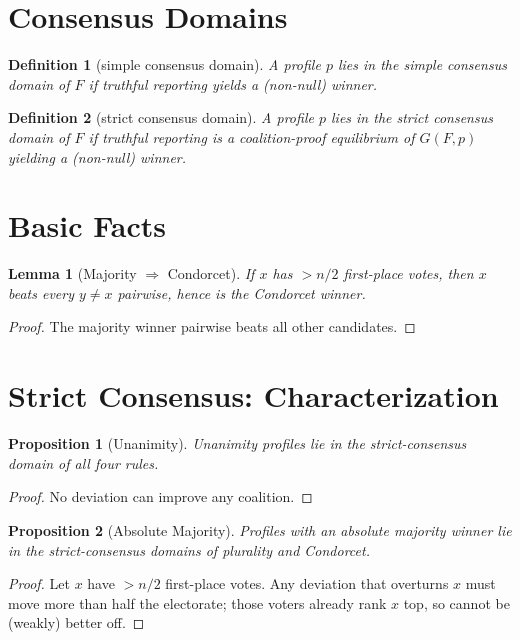\documentclass{article}
\newtheorem{lemma}{Lemma}
\newtheorem{proposition}{Proposition}
\newtheorem{definition}{Definition}
\begin{document}
\section{Consensus Domains}
\begin{definition}[simple consensus domain]
A profile $p$ lies in the simple consensus domain of $F$ if truthful reporting yields a (non-null) winner.
\end{definition}

\begin{definition}[strict consensus domain]
A profile $p$ lies in the strict consensus domain of $F$ if truthful reporting is a coalition-proof equilibrium of $G(F,p)$ yielding a (non-null) winner.
\end{definition}

\section{Basic Facts}
\begin{lemma}[Majority $\Rightarrow$ Condorcet]
If $x$ has $> n/2$ first-place votes, then $x$ beats every $y\neq x$ pairwise, hence is the Condorcet winner.
\end{lemma}
\begin{proof}
The majority winner pairwise beats all other candidates.
\end{proof}

\section{Strict Consensus: Characterization}
\begin{proposition}[Unanimity]
Unanimity profiles lie in the strict-consensus domain of all four rules.
\end{proposition}
\begin{proof}
No deviation can improve any coalition.
\end{proof}

\begin{proposition}[Absolute Majority]
Profiles with an absolute majority winner lie in the strict-consensus domains of plurality and Condorcet.
\end{proposition}
\begin{proof}
Let $x$ have $> n/2$ first-place votes. Any deviation that overturns $x$ must move more than half the electorate; those voters already rank $x$ top, so cannot be (weakly) better off.
\end{proof}
\end{document}
